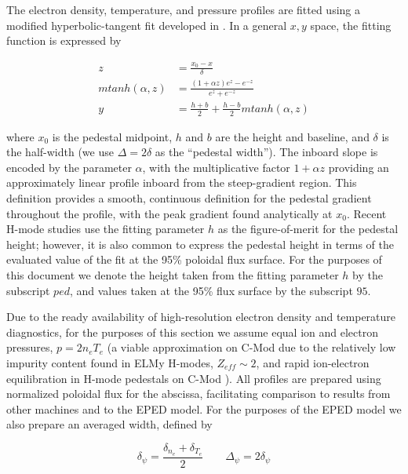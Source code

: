 The electron density, temperature, and pressure profiles are fitted using a modified hyperbolic-tangent fit developed in \cite{Groebner2001}.  In a general $x,y$ space, the fitting function is expressed by

\begin{equation}\label{eq:mtanh}
 \begin{aligned}
  z &= \frac{x_0 - x}{\delta}\\
  mtanh(\alpha,z) &= \frac{(1 + \alpha z) e^z - e^{-z}}{e^z + e^{-z}}\\
  y &= \frac{h+b}{2} + \frac{h-b}{2} mtanh(\alpha,z)
 \end{aligned}
\end{equation}

\noindent where $x_0$ is the pedestal midpoint, $h$ and $b$ are the height and baseline, and $\delta$ is the half-width (we use $\Delta = 2\delta$ as the ``pedestal width'').  The inboard slope is encoded by the parameter $\alpha$, with the multiplicative factor $1 + \alpha z$ providing an approximately linear profile inboard from the steep-gradient region.  This definition provides a smooth, continuous definition for the pedestal gradient throughout the profile, with the peak gradient found analytically at $x_0$.  Recent H-mode studies use the fitting parameter $h$ as the figure-of-merit for the pedestal height; however, it is also common to express the pedestal height in terms of the evaluated value of the fit at the 95\% poloidal flux surface.  For the purposes of this document we denote the height taken from the fitting parameter $h$ by the subscript $ped$, and values taken at the 95\% flux surface by the subscript $95$. 

Due to the ready availability of high-resolution electron density and temperature diagnostics, for the purposes of this section we assume equal ion and electron pressures, $p = 2n_e T_e$ (a viable approximation on C-Mod due to the relatively low impurity content found in ELMy H-modes, $Z_{eff} \sim 2$, and rapid ion-electron equilibration in H-mode pedestals on C-Mod \cite{McDermott2009a}).  All profiles are prepared using normalized poloidal flux for the abscissa, facilitating comparison to results from other machines and to the EPED model.  For the purposes of the EPED model we also prepare an averaged width, defined by

\begin{equation}\label{eq:wid_eped}
  \delta_\psi = \frac{\delta_{n_e} + \delta_{T_e}}{2}\qquad
  \Delta_\psi = 2\delta_\psi
\end{equation}

